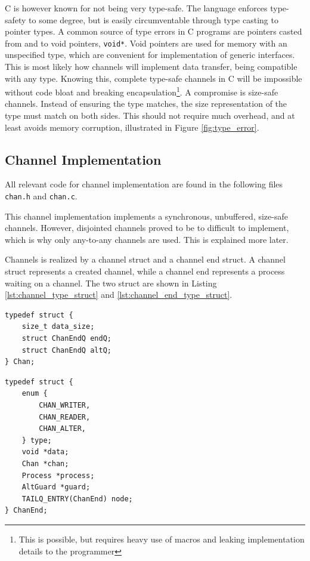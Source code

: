 C is however known for not being very type\hyp{}safe. The language enforces type\hyp{}safety to some degree, but is easily circumventable through type casting to pointer types. A common source of type errors in C programs are pointers casted from and to void pointers, \texttt{void*}. Void pointers are used for memory with an unspecified type, which are convenient for implementation of generic interfaces. This is most likely how channels will implement data transfer, being compatible with any type. Knowing this, complete type\hyp{}safe channels in C will be impossible without code bloat and breaking encapsulation\footnote{This is possible, but requires heavy use of macros and leaking implementation details to the programmer}. A compromise is size\hyp{}safe channels. Instead of ensuring the type matches, the size representation of the type must match on both sides. This should not require much overhead, and at least avoids memory corruption, illustrated in Figure \ref{fig:type_error}.


\subsection{Channel Implementation}

All relevant code for channel implementation are found in the following files \texttt{chan.h} and \texttt{chan.c}.

This channel implementation implements a synchronous, unbuffered, size\hyp{}safe channels. However, disjointed channels proved to be to difficult to implement, which is why only any\hyp{}to\hyp{}any channels are used. This is explained more later. 

Channels is realized by a channel struct and a channel end struct. A channel struct represents a created channel, while a channel end represents a process waiting on a channel. The two struct are shown in Listing \ref{lst:channel_type_struct} and \ref{lst:channel_end_type_struct}.

\noindent\begin{minipage}{.45\textwidth}
\begin{lstlisting}[caption={Channel type struct},style={CustomC},label={lst:channel_type_struct}]
typedef struct {
    size_t data_size;
    struct ChanEndQ endQ;
    struct ChanEndQ altQ;
} Chan;
\end{lstlisting}
\end{minipage}\hfill
\begin{minipage}{.45\textwidth}
\begin{lstlisting}[caption={Channel end type struct},style={CustomC},label={lst:channel_end_type_struct}]
typedef struct {
    enum {
        CHAN_WRITER,
        CHAN_READER,
        CHAN_ALTER,
    } type;
    void *data;
    Chan *chan;
    Process *process;
    AltGuard *guard;
    TAILQ_ENTRY(ChanEnd) node;
} ChanEnd;
\end{lstlisting}
\end{minipage}

